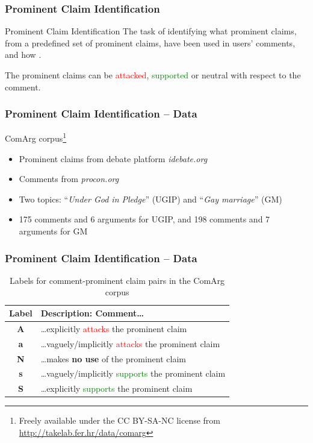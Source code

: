 \documentclass{beamer}
\newcommand{\pro}[1]{\textcolor{green}{#1}}
\newcommand{\con}[1]{\textcolor{red}{#1}}
\begin{document}
\begin{frame}
\frametitle{Prominent Claim Identification}
	\begin{block}{Prominent Claim Identification}
The task of identifying what prominent claims, from a predefined set of
prominent claims, have been used in users' comments, and how \cite{boltuzic2014back}. 
\\
\vspace{0.5cm}

The prominent claims can be \textcolor{red}{attacked}, 
\textcolor{green}{supported} or neutral with respect to the comment.
	\end{block}
\end{frame}

\begin{frame}
\frametitle{Prominent Claim Identification -- Data}

ComArg corpus\footnote{Freely available under the CC BY-SA-NC license from
\url{http://takelab.fer.hr/data/comarg}}

\begin{itemize}
	\item Prominent claims from debate platform \textit{idebate.org}
	\item Comments from \textit{procon.org}
	\item Two topics: ``\textit{Under God in Pledge}'' (UGIP) and 
``\textit{Gay marriage}'' (GM)
	\item 175
comments and 6 arguments for UGIP, and 198 comments and 7 arguments for GM
\end{itemize}

\end{frame}

\begin{frame}
\frametitle{Prominent Claim Identification -- Data}

\begin{table}
\centering
{\small
\begin{tabular}{cl}
\toprule
Label & Description: Comment\dots \\
\midrule
\textbf{A} & \dots explicitly \con{attacks} the prominent claim \\
\textbf{a} & \dots vaguely/implicitly \con{attacks} the prominent claim \\
\textbf{N} & \dots makes \textbf{no use} of the prominent claim \\
\textbf{s} & \dots vaguely/implicitly \pro{supports} the prominent claim \\
\textbf{S} & \dots explicitly \pro{supports} the prominent claim \\
\bottomrule
\end{tabular}
}
\caption{Labels for comment-prominent claim pairs in the ComArg corpus}
\label{tab:comarg-labels}
\end{table}
\end{frame}
\end{document}
